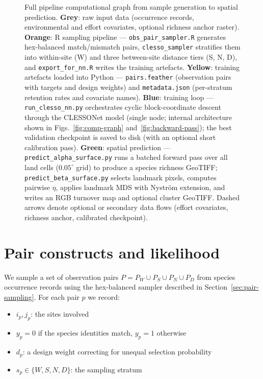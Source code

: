 \documentclass{article}
\begin{document}
\begin{landscape}
\begin{figure}[h]
{\begin{tikzpicture}
\end{tikzpicture}
}%
\caption{%
Full pipeline computational graph from sample generation to spatial prediction.
\textbf{Grey}: raw input data (occurrence records, environmental and effort covariates, optional richness anchor raster).
\textbf{Orange}: R sampling pipeline --- \texttt{obs\_pair\_sampler.R} generates hex-balanced match/mismatch pairs, \texttt{clesso\_sampler} stratifies them into within-site (W) and three between-site distance tiers (S, N, D), and \texttt{export\_for\_nn.R} writes the training artefacts.
\textbf{Yellow}: training artefacts loaded into Python --- \texttt{pairs.feather} (observation pairs with targets and design weights) and \texttt{metadata.json} (per-stratum retention rates and covariate names).
\textbf{Blue}: training loop --- \texttt{run\_clesso\_nn.py} orchestrates cyclic block-coordinate descent through the CLESSONet model (single node; internal architecture shown in Figs.~\ref{fig:comp-graph} and~\ref{fig:backward-pass}); the best validation checkpoint is saved to disk (with an optional short calibration pass).
\textbf{Green}: spatial prediction --- \texttt{predict\_alpha\_surface.py} runs a batched forward pass over all land cells ($0.05^\circ$ grid) to produce a species richness GeoTIFF; \texttt{predict\_beta\_surface.py} selects landmark pixels, computes pairwise $\eta$, applies landmark MDS with Nystr\"{o}m extension, and writes an RGB turnover map and optional cluster GeoTIFF.
Dashed arrows denote optional or secondary data flows (effort covariates, richness anchor, calibrated checkpoint).%
}
\label{fig:full-pipeline}
\end{figure}
\vspace*{-0.5cm}
\end{landscape}

\section{Pair constructs and likelihood}

We sample a set of observation pairs $P = P_W \cup P_S \cup P_N \cup P_D$ from species occurrence records using the hex-balanced sampler described in Section~\ref{sec:pair-sampling}. For each pair $p$ we record:

\begin{itemize}
    \item $i_p, j_p$: the sites involved
    \item $y_p = 0$ if the species identities match, $y_p = 1$ otherwise
    \item $d_p$: a design weight correcting for unequal selection probability
    \item $s_p \in \{W, S, N, D\}$: the sampling stratum
\end{itemize}
\end{document}
